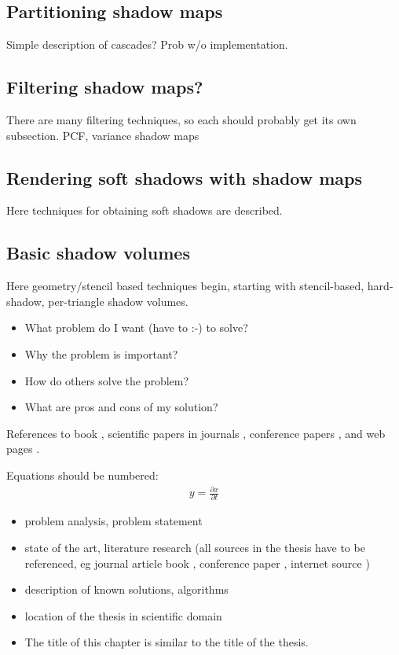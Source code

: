 \subsection{Partitioning shadow maps}
Simple description of cascades? Prob w/o implementation.

\subsection{Filtering shadow maps?}
There are many filtering techniques, so each should probably get its own subsection. PCF, variance shadow maps

\subsection{Rendering soft shadows with shadow maps}
Here techniques for obtaining soft shadows are described.

\subsection{Basic shadow volumes}
Here geometry/stencil based techniques begin, starting with stencil-based, hard-shadow, per-triangle shadow volumes.


\begin{itemize}
\item What problem do I want (have to :-) to solve?
\item Why the problem is important?
\item How do others solve the problem?
\item What are pros and cons of my solution?
\end{itemize}

References to 
book \cite{bib:book},
scientific papers in journals \cite{bib:article},
conference papers \cite{bib:conference},
and web pages \cite{bib:internet}.

Equations should be numbered:
\begin{align}
y = \frac{\partial x}{\partial t}
\end{align}

\begin{itemize}
\item problem analysis, problem statement
\item state of the art, literature research (all sources in the thesis have to be referenced, eg journal article \cite{bib:article} book \cite{bib:book}, conference paper \cite{bib:conference}, internet source \cite{bib:internet})
\item description of known solutions, algorithms
\item location of the thesis in scientific domain
\item The title of this chapter is similar to the title of the thesis.
\end{itemize}

